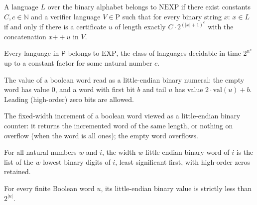 \begin{definition}
\label{Complexity.NEXP}
\leanok
{}
A language $L$ over the binary alphabet belongs to $\mathrm{NEXP}$ if there exist
constants $C, c \in \mathbb{N}$ and a verifier language $V \in \mathrm{P}$ such that
for every binary string $x$: $x \in L$ if and only if there is a certificate $u$ of
length exactly $C \cdot 2^{(|x|+1)^c}$ with the concatenation
$x \mathbin{+\!\!+} u$ in $V$.
\end{definition}

\begin{theorem}
\label{Complexity.P_subset_EXP}
\leanok
{}
Every language in $\mathsf{P}$ belongs to $\mathrm{EXP}$, the class of languages
decidable in time $2^{n^c}$ up to a constant factor for some natural number $c$.
\end{theorem}

\begin{definition}
\label{Complexity.enumValue}
\leanok
The value of a boolean word read as a little-endian binary numeral: the empty word
has value $0$, and a word with first bit $b$ and tail $u$ has value
$2 \cdot \mathrm{val}(u) + b$. Leading (high-order) zero bits are allowed.
\end{definition}

\begin{definition}
\label{Complexity.enumInc}
\leanok
The fixed-width increment of a boolean word viewed as a little-endian binary
counter: it returns the incremented word of the same length, or nothing on
overflow (when the word is all ones); the empty word overflows.
\end{definition}

\begin{definition}
\label{Complexity.enumWord}
\leanok
For all natural numbers $w$ and $i$, the width-$w$ little-endian binary word of
$i$ is the list of the $w$ lowest binary digits of $i$, least significant first,
with high-order zeros retained.
\end{definition}

\begin{lemma}
\label{Complexity.enumValue_lt}
\leanok
{}
For every finite Boolean word $u$, its little-endian binary value is strictly less than
$2^{|u|}$.
\end{lemma}

